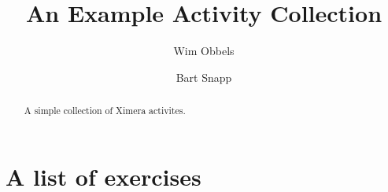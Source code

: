 \documentclass{xourse}
\author{Wim Obbels \and Bart Snapp}
\title{An Example Activity Collection}
\begin{document}
\begin{abstract}
    A simple collection of Ximera activites.
\end{abstract}
\maketitle

\part{A list of exercises}



\end{document}
